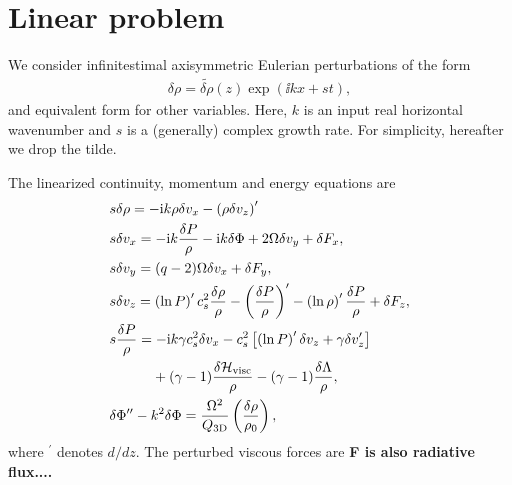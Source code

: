 \section{Linear problem}\label{linear}
We consider infinitestimal axisymmetric Eulerian perturbations of the
form \begin{align}
  \delta \rho= \widetilde{\delta \rho}(z)\exp{\left(\ii kx +
    s t\right)},  
\end{align}
and equivalent form for other variables. Here, $k$  is an input real horizontal
wavenumber and $s$ is a (generally) complex growth rate.  
For simplicity, hereafter we drop the tilde.  


The linearized continuity, momentum and energy equations are
\begin{align}
   &s \delta \rho = - \ii k \rho\delta v_x -
  \left(\rho\delta v_z\right)^\prime \label{lin_mass} \\ 
   &s  \delta v_x = - \ii k\frac{\delta P}{\rho} - \ii k \delta 
  \Phi + 2\Omega \delta v_y + \delta F_x,\\
   &s \delta v_y = (q-2)\Omega\delta v_x + \delta F_y,\\
  &s \delta v_z =
  \left(\ln{P}\right)^\prime c_s^2\frac{\delta\rho}{\rho} -
  \left(\frac{\delta P}{\rho}\right)^\prime -
  \left(\ln{\rho}\right)^\prime\frac{\delta P}{\rho} + \delta F_z, \\ 
  &s \frac{\delta P}{\rho} = 
 - \ii k \gamma c_s^2\delta v_x
- c_s^2\left[
 \left(\ln{P}\right)^\prime\delta v_z + 
  \gamma\delta v_z^\prime\right] \notag\\
   & \phantom{s \frac{\delta P}{\rho}=}
  + (\gamma-1)\frac{\delta\mathcal{H}_\mathrm{visc}}{\rho} 
  -(\gamma-1)\frac{\delta\Lambda}{\rho}
  \label{lin_energy},\\
  &\delta\Phi^{\prime\prime} - k^2\delta\Phi =
  \frac{\Omega^2}{Q_\mathrm{3D}}\left(\frac{\delta\rho}{\rho_0}\right)\label{lin_gravity},  
\end{align}
where $^\prime$ denotes $d/dz$. The perturbed viscous forces are {\bf F is also radiative flux....}
